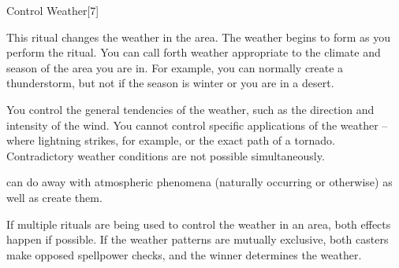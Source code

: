 \begin{spellsection}{Control Weather}[7]
    \begin{spellheader}
    \end{spellheader}
    \begin{spellcontent}
        \begin{spelltargetinginfo}
        \end{spelltargetinginfo}
        \begin{spelleffects}
            \spelleffect This ritual changes the weather in the area. The weather begins to form as you perform the ritual. You can call forth weather appropriate to the climate and season of the area you are in. For example, you can normally create a thunderstorm, but not if the season is winter or you are in a desert.
            \par You control the general tendencies of the weather, such as the direction and intensity of the wind. You cannot control specific applications of the weather -- where lightning strikes, for example, or the exact path of a tornado. Contradictory weather conditions are not possible simultaneously.
            \spelldur \durext
        \end{spelleffects}
    \end{spellcontent}
    \begin{spellfooter}
        \spellnotes {} can do away with atmospheric phenomena (naturally occurring or otherwise) as well as create them.

        If multiple rituals are being used to control the weather in an area, both effects happen if possible. If the weather patterns are mutually exclusive, both casters make opposed spellpower checks, and the winner determines the weather.
    \end{spellfooter}
\end{spellsection}

